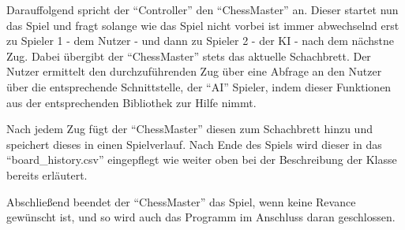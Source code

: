 Darauffolgend spricht der ``Controller'' den ``ChessMaster'' an. Dieser startet nun das Spiel und fragt solange wie das Spiel nicht vorbei ist immer abwechselnd erst zu Spieler 1 - dem Nutzer - und dann zu Spieler 2 - der KI - nach dem nächstne Zug. Dabei übergibt der ``ChessMaster'' stets das aktuelle Schachbrett. Der Nutzer ermittelt den durchzuführenden Zug über eine Abfrage an den Nutzer über die entsprechende Schnittstelle, der ``AI'' Spieler, indem dieser Funktionen aus der entsprechenden Bibliothek zur Hilfe nimmt.

Nach jedem Zug fügt der ``ChessMaster'' diesen zum Schachbrett hinzu und speichert dieses in einen Spielverlauf. Nach Ende des Spiels wird dieser in das ``board\_history.csv'' eingepflegt wie weiter oben bei der Beschreibung der Klasse bereits erläutert.

Abschließend beendet der ``ChessMaster'' das Spiel, wenn keine Revance gewünscht ist, und so wird auch das Programm im Anschluss daran geschlossen.


